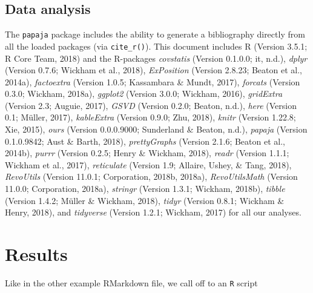 \documentclass[man,floatsintext]{apa6}
\theoremstyle{definition}
\theoremstyle{definition}
\theoremstyle{definition}
\theoremstyle{remark}
\begin{document}
\hypertarget{data-analysis}{%
\subsection{Data analysis}\label{data-analysis}}

The \texttt{papaja} package includes the ability to generate a
bibliography directly from all the loaded packages (via
\texttt{cite\_r()}). This document includes R (Version 3.5.1; R Core
Team, 2018) and the R-packages \emph{covstatis} (Version 0.1.0.0; it,
n.d.), \emph{dplyr} (Version 0.7.6; Wickham et al., 2018),
\emph{ExPosition} (Version 2.8.23; Beaton et al., 2014a),
\emph{factoextra} (Version 1.0.5; Kassambara \& Mundt, 2017),
\emph{forcats} (Version 0.3.0; Wickham, 2018a), \emph{ggplot2} (Version
3.0.0; Wickham, 2016), \emph{gridExtra} (Version 2.3; Auguie, 2017),
\emph{GSVD} (Version 0.2.0; Beaton, n.d.), \emph{here} (Version 0.1;
Müller, 2017), \emph{kableExtra} (Version 0.9.0; Zhu, 2018),
\emph{knitr} (Version 1.22.8; Xie, 2015), \emph{ours} (Version
0.0.0.9000; Sunderland \& Beaton, n.d.), \emph{papaja} (Version
0.1.0.9842; Aust \& Barth, 2018), \emph{prettyGraphs} (Version 2.1.6;
Beaton et al., 2014b), \emph{purrr} (Version 0.2.5; Henry \& Wickham,
2018), \emph{readr} (Version 1.1.1; Wickham et al., 2017),
\emph{reticulate} (Version 1.9; Allaire, Ushey, \& Tang, 2018),
\emph{RevoUtils} (Version 11.0.1; Corporation, 2018b, 2018a),
\emph{RevoUtilsMath} (Version 11.0.0; Corporation, 2018a),
\emph{stringr} (Version 1.3.1; Wickham, 2018b), \emph{tibble} (Version
1.4.2; Müller \& Wickham, 2018), \emph{tidyr} (Version 0.8.1; Wickham \&
Henry, 2018), and \emph{tidyverse} (Version 1.2.1; Wickham, 2017) for
all our analyses.

\hypertarget{results}{%
\section{Results}\label{results}}

Like in the other example RMarkdown file, we call off to an \texttt{R}
script
\end{document}

